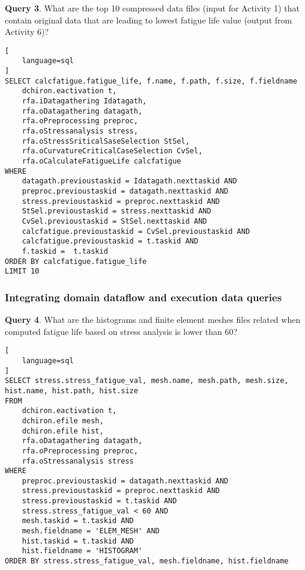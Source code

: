 \vspace{1.5em}
\noindent \textbf{Query 3}.
What are the top 10 compressed data files (input for Activity 1) that contain original data that are leading to lowest fatigue life value (output from Activity 6)?

\noindent\begin{minipage}[t]{1.0\linewidth}
\begin{lstlisting}[
    language=sql
]
SELECT calcfatigue.fatigue_life, f.name, f.path, f.size, f.fieldname
	dchiron.eactivation t,
	rfa.iDatagathering Idatagath,
	rfa.oDatagathering datagath,
	rfa.oPreprocessing preproc,
	rfa.oStressanalysis stress,
	rfa.oStressSriticalSaseSelection StSel,
	rfa.oCurvatureCriticalCaseSelection CvSel,
	rfa.oCalculateFatigueLife calcfatigue
WHERE
	datagath.previoustaskid = Idatagath.nexttaskid AND
	preproc.previoustaskid = datagath.nexttaskid AND
	stress.previoustaskid = preproc.nexttaskid AND
	StSel.previoustaskid = stress.nexttaskid AND
	CvSel.previoustaskid = StSel.nexttaskid AND
	calcfatigue.previoustaskid = CvSel.previoustaskid AND
	calcfatigue.previoustaskid = t.taskid AND
	f.taskid =  t.taskid
ORDER BY calcfatigue.fatigue_life
LIMIT 10
\end{lstlisting}
\end{minipage}


\subsubsection{Integrating domain dataflow and execution data queries}

\noindent \textbf{Query 4}.
What are the histograms and finite element meshes files related when computed fatigue life based on stress analysis is lower than 60?

\noindent\begin{minipage}[t]{1.0\linewidth}
\begin{lstlisting}[
    language=sql
]
SELECT stress.stress_fatigue_val, mesh.name, mesh.path, mesh.size, hist.name, hist.path, hist.size
FROM
	dchiron.eactivation t,
	dchiron.efile mesh,
	dchiron.efile hist,
	rfa.oDatagathering datagath,
	rfa.oPreprocessing preproc,
	rfa.oStressanalysis stress
WHERE
	preproc.previoustaskid = datagath.nexttaskid AND
	stress.previoustaskid = preproc.nexttaskid AND
	stress.previoustaskid = t.taskid AND
	stress.stress_fatigue_val < 60 AND
	mesh.taskid = t.taskid AND
	mesh.fieldname = 'ELEM_MESH' AND
	hist.taskid = t.taskid AND
	hist.fieldname = 'HISTOGRAM'
ORDER BY stress.stress_fatigue_val, mesh.fieldname, hist.fieldname
\end{lstlisting}
\end{minipage}



